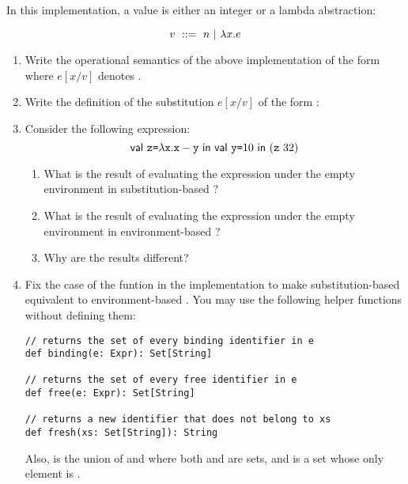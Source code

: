 \begin{enumerate}
In this implementation, a value is either an integer or a lambda abstraction:

\[ v\ ::=\ n\ |\ \lambda x.e \]

\begin{enumerate}
  \item
    Write the operational semantics of the above implementation
    of the form 
    where $e[x/v]$ denotes .

  \item Write the definition of the substitution $e[x/v]$
    of the form :

  \item Consider the following expression:
\[
\ebind{\code{z}}{\efun{\cx}{\esub{\cx}{\cy}}}{
    \ebind{\cy}{10}{
        (\eapp{\code{z}}{32})
    }
}
\]

\begin{enumerate}
\item What is the result of evaluating the expression under the empty
  environment in substitution-based \lang?
\item What is the result of evaluating the expression under the empty
  environment in environment-based \lang?
\item Why are the results different?
\end{enumerate}

  \item Fix the  case of the funtion  in the
    implementation to make substitution-based \lang equivalent to
    environment-based \lang.  You may use the following helper functions
    without defining them:

\begin{verbatim}
// returns the set of every binding identifier in e
def binding(e: Expr): Set[String]

// returns the set of every free identifier in e
def free(e: Expr): Set[String]

// returns a new identifier that does not belong to xs
def fresh(xs: Set[String]): String
\end{verbatim}

    Also,  is the union of  and  where both
     and  are sets, and  is a set whose only
    element is .

\end{enumerate}


\end{enumerate}
